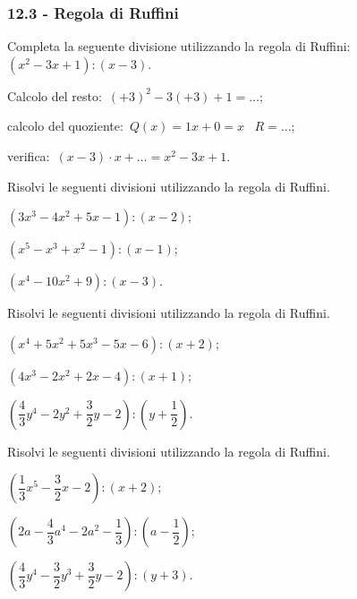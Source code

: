 \subsubsection*{12.3 - Regola di Ruffini}

\begin{esercizio}
\label{ese:12.8}
Completa la seguente divisione utilizzando la regola di Ruffini:\:$\left(x^{2}-3x+1\right):(x-3)$.
\begin{itemize*}
\item Calcolo del resto:~$(+3)^{2}-3(+3)+1=\ldots$;
\item calcolo del quoziente:~$Q(x)=1x+0=x$ \quad~$R=\ldots$;
\item verifica:~$(x-3)\cdot x+\ldots =x^{2}-3x+1$.
\end{itemize*}
\end{esercizio}

\begin{esercizio}[\Ast]
\label{ese:12.9}
Risolvi le seguenti divisioni utilizzando la regola di Ruffini.
 \begin{enumeratea}
 \item $\left(3x^{3}-4x^{2}+5x-1\right):(x-2)$;%
 \item $\left(x^{5}-x^{3}+x^{2}-1\right):(x-1)$;%
 \item $\left(x^{4}-10x^{2}+9\right):(x-3)$.%
 \end{enumeratea}
\end{esercizio}

\begin{esercizio}[\Ast]
\label{ese:12.10}
Risolvi le seguenti divisioni utilizzando la regola di Ruffini.
 \begin{enumeratea}
 \item $\left(x^{4}+5x^{2}+5x^{3}-5x-6 \right):(x+2)$;%
 \item $\left(4x^{3}-2x^{2}+2x-4 \right):(x+1)$;%
 \item $\left(\dfrac{4}{3}y^{4}-2y^{2}+\dfrac{3}{2}y-2\right):\left(y+\dfrac{1}{2}\right)$.%
 \end{enumeratea}
\end{esercizio}

\begin{esercizio}[\Ast]
\label{ese:12.11}
Risolvi le seguenti divisioni utilizzando la regola di Ruffini.
 \begin{enumeratea}
 \item $\left(\dfrac{1}{3}x^{5}-\dfrac{3}{2}x-2\right):(x+2)$;
 \item $\left(2a-\dfrac{4}{3}a^{4}-2a^{2}-\dfrac{1}{3}\right):\left(a-\dfrac{1}{2}\right)$;
 \item $\left(\dfrac{4}{3}y^{4}-\dfrac{3}{2}y^{3}+\dfrac{3}{2}y-2\right):\left(y+3\right)$.
 \end{enumeratea}
\end{esercizio}

